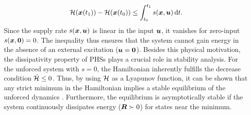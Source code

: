 \begin{equation}
    {\mathcal{H}}(\boldsymbol{x}(t_1)) - {\mathcal{H}}(\boldsymbol{x}(t_0)) \leq \int_{t_0}^{t_1} s(\boldsymbol{x},\boldsymbol{u}) \mathop{}\!\mathrm{d} t.
\end{equation}
Since the supply rate $s(\boldsymbol{x},\boldsymbol{u})$ is linear in the input $\boldsymbol{u}$, it vanishes for zero-input $s(\boldsymbol{x},\boldsymbol{0})=0$. The inequality thus ensures that the system cannot gain energy in the absence of an external excitation ($\boldsymbol{u}=\boldsymbol{0}$). Besides this physical motivation, the dissipativity property of \glspl{PHS} plays a crucial role in stability analysis. 
For the unforced system with ${s=0}$, the Hamiltonian inherently fulfills the decrease condition $\dot{{\mathcal{H}}}\leq0$.
Thus, by using ${\mathcal{H}}$ as a Lyapunov function, it can be shown that any strict minimum in the Hamiltonian implies a stable equilibrium of the unforced dynamics \cite{vanderschaft2014}.  
Furthermore, the equilibrium is asymptotically stable if the system continuously dissipates energy ($\boldsymbol{R}\succ0$) for states near the minimum.


